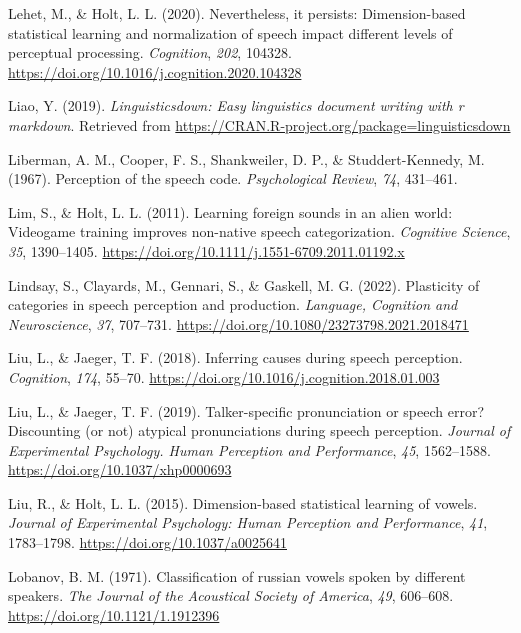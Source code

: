\documentclass[
  11pt,
  english,
  man,floatsintext]{apa6}
\newlength{\cslhangindent}
\newlength{\cslentryspacingunit} %
\newenvironment{CSLReferences}[2] %
 {%
  \setlength{\parindent}{0pt}
  \ifodd #1
  \let\oldpar\par
  \def\par{\hangindent=\cslhangindent\oldpar}
  \fi
  \setlength{\parskip}{#2\cslentryspacingunit}
 }%
 {}
\begin{document}
\begin{CSLReferences}{1}{0}
\leavevmode{}%
Lehet, M., \& Holt, L. L. (2020). Nevertheless, it persists: Dimension-based statistical learning and normalization of speech impact different levels of perceptual processing. \emph{Cognition}, \emph{202}, 104328. \url{https://doi.org/10.1016/j.cognition.2020.104328}

\leavevmode{}%
Liao, Y. (2019). \emph{Linguisticsdown: Easy linguistics document writing with r markdown}. Retrieved from \url{https://CRAN.R-project.org/package=linguisticsdown}

\leavevmode{}%
Liberman, A. M., Cooper, F. S., Shankweiler, D. P., \& Studdert-Kennedy, M. (1967). Perception of the speech code. \emph{Psychological Review}, \emph{74}, 431--461.

\leavevmode{}%
Lim, S., \& Holt, L. L. (2011). Learning foreign sounds in an alien world: Videogame training improves non-native speech categorization. \emph{Cognitive Science}, \emph{35}, 1390--1405. \url{https://doi.org/10.1111/j.1551-6709.2011.01192.x}

\leavevmode{}%
Lindsay, S., Clayards, M., Gennari, S., \& Gaskell, M. G. (2022). Plasticity of categories in speech perception and production. \emph{Language, Cognition and Neuroscience}, \emph{37}, 707--731. \url{https://doi.org/10.1080/23273798.2021.2018471}

\leavevmode{}%
Liu, L., \& Jaeger, T. F. (2018). Inferring causes during speech perception. \emph{Cognition}, \emph{174}, 55--70. \url{https://doi.org/10.1016/j.cognition.2018.01.003}

\leavevmode{}%
Liu, L., \& Jaeger, T. F. (2019). Talker-specific pronunciation or speech error? Discounting (or not) atypical pronunciations during speech perception. \emph{Journal of Experimental Psychology. Human Perception and Performance}, \emph{45}, 1562--1588. \url{https://doi.org/10.1037/xhp0000693}

\leavevmode{}%
Liu, R., \& Holt, L. L. (2015). Dimension-based statistical learning of vowels. \emph{Journal of Experimental Psychology: Human Perception and Performance}, \emph{41}, 1783--1798. \url{https://doi.org/10.1037/a0025641}

\leavevmode{}%
Lobanov, B. M. (1971). Classification of russian vowels spoken by different speakers. \emph{The Journal of the Acoustical Society of America}, \emph{49}, 606--608. \url{https://doi.org/10.1121/1.1912396}


\end{CSLReferences}
\end{document}
